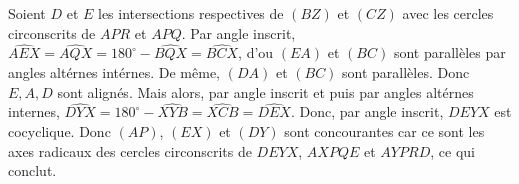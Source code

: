 \begin{sol}
\begin{center}
\end{center}

Soient $D$ et $E$ les intersections respectives de $\left(BZ\right)$ et $\left(CZ\right)$ avec les cercles circonscrits de $APR$ et $APQ$. Par angle inscrit, $\widehat{AEX} = \widehat{AQX} = 180^\circ - \widehat{BQX} = \widehat{BCX}$, d'ou $\left(EA\right)$ et $\left(BC\right)$ sont parallèles par angles altérnes intérnes. De même, $\left(DA\right)$ et $\left(BC\right)$ sont parallèles. Donc $E,A,D$ sont alignés. Mais alors, par angle inscrit et puis par angles altérnes internes, $\widehat{DYX} = 180^\circ - \widehat{XYB} = \widehat{XCB} = \widehat{DEX}$. Donc, par angle inscrit, $DEYX$ est cocyclique. Donc $\left(AP\right)$, $\left(EX\right)$ et $\left(DY\right)$ sont concourantes car ce sont les axes radicaux des cercles circonscrits de $DEYX$, $AXPQE$ et $AYPRD$, ce qui conclut.
\end{sol}


